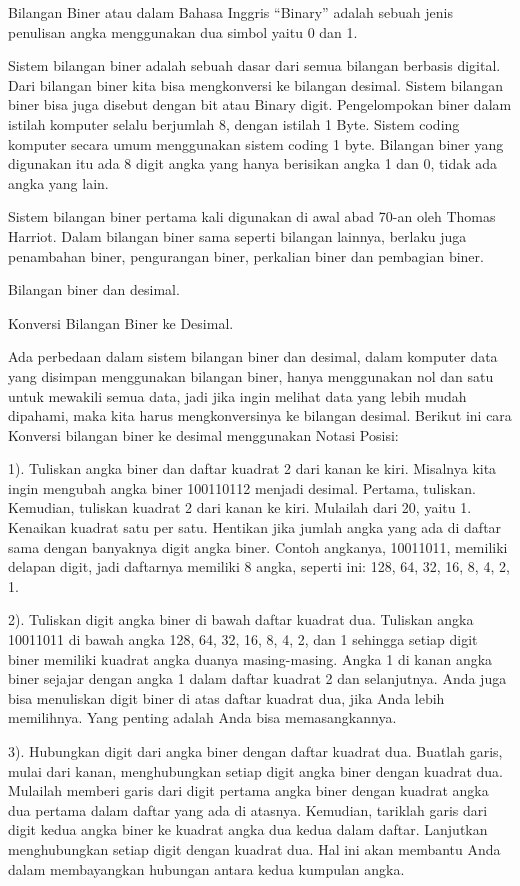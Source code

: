 \documentclass{article}
\begin{document}
Bilangan Biner atau dalam Bahasa Inggris “Binary” adalah sebuah jenis penulisan angka menggunakan dua simbol yaitu 0 dan 1. 

Sistem bilangan biner adalah sebuah dasar dari semua bilangan berbasis digital. Dari bilangan biner kita bisa mengkonversi ke bilangan desimal. Sistem bilangan biner bisa juga disebut dengan bit atau Binary digit. Pengelompokan biner dalam istilah komputer selalu berjumlah 8, dengan istilah 1 Byte. Sistem coding komputer secara umum menggunakan sistem coding 1 byte. Bilangan biner yang digunakan itu ada 8 digit angka yang hanya berisikan angka 1 dan 0, tidak ada angka yang lain.

Sistem bilangan biner pertama kali digunakan di awal abad 70-an oleh Thomas Harriot. Dalam bilangan biner sama seperti bilangan lainnya, berlaku juga penambahan biner, pengurangan biner, perkalian biner dan pembagian biner.

Bilangan biner dan desimal.

Konversi Bilangan Biner ke Desimal.

Ada perbedaan dalam sistem bilangan biner dan desimal, dalam komputer data yang disimpan menggunakan bilangan biner, hanya menggunakan nol dan satu untuk mewakili semua data, jadi jika ingin melihat data yang lebih mudah dipahami, maka kita harus mengkonversinya ke bilangan desimal. Berikut ini cara Konversi bilangan biner ke desimal menggunakan Notasi Posisi:

1). Tuliskan angka biner dan daftar kuadrat 2 dari kanan ke kiri. Misalnya kita ingin mengubah angka biner 100110112 menjadi desimal. Pertama, tuliskan. Kemudian, tuliskan kuadrat 2 dari kanan ke kiri. Mulailah dari 20, yaitu 1. Kenaikan kuadrat satu per satu. Hentikan jika jumlah angka yang ada di daftar sama dengan banyaknya digit angka biner. Contoh angkanya, 10011011, memiliki delapan digit, jadi daftarnya memiliki 8 angka, seperti ini: 128, 64, 32, 16, 8, 4, 2, 1.

2). Tuliskan digit angka biner di bawah daftar kuadrat dua. Tuliskan angka 10011011 di bawah angka 128, 64, 32, 16, 8, 4, 2, dan 1 sehingga setiap digit biner memiliki kuadrat angka duanya masing-masing. Angka 1 di kanan angka biner sejajar dengan angka 1 dalam daftar kuadrat 2 dan selanjutnya. Anda juga bisa menuliskan digit biner di atas daftar kuadrat dua, jika Anda lebih memilihnya. Yang penting adalah Anda bisa memasangkannya.

3). Hubungkan digit dari angka biner dengan daftar kuadrat dua. Buatlah garis, mulai dari kanan, menghubungkan setiap digit angka biner dengan kuadrat dua. Mulailah memberi garis dari digit pertama angka biner dengan kuadrat angka dua pertama dalam daftar yang ada di atasnya. Kemudian, tariklah garis dari digit kedua angka biner ke kuadrat angka dua kedua dalam daftar. Lanjutkan menghubungkan setiap digit dengan kuadrat dua. Hal ini akan membantu Anda dalam membayangkan hubungan antara kedua kumpulan angka.
\end{document}
